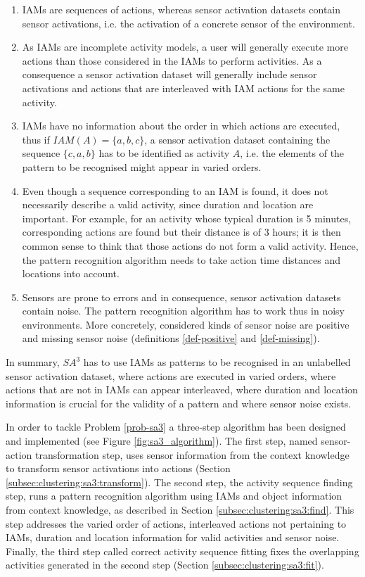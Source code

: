 \begin{enumerate}
 \item IAMs are sequences of actions, whereas sensor activation datasets contain sensor activations, i.e. the activation of a concrete sensor of the environment.
 \item As IAMs are incomplete activity models, a user will generally execute more actions than those considered in the IAMs to perform activities. As a consequence a sensor activation dataset will generally include sensor activations and actions that are interleaved with IAM actions for the same activity.
 \item IAMs have no information about the order in which actions are executed, thus if $IAM(A) = \{a, b, c\}$, a sensor activation dataset containing the sequence $\{c, a, b\}$ has to be identified as activity $A$, i.e. the elements of the pattern to be recognised might appear in varied orders.
 \item Even though a sequence corresponding to an IAM is found, it does not necessarily describe a valid activity, since duration and location are important. For example, for an activity whose typical duration is 5 minutes, corresponding actions are found but their distance is of 3 hours; it is then common sense to think that those actions do not form a valid activity. Hence, the pattern recognition algorithm needs to take action time distances and locations into account.
 \item Sensors are prone to errors and in consequence, sensor activation datasets contain noise. The pattern recognition algorithm has to work thus in noisy environments. More concretely, considered kinds of sensor noise are positive and missing sensor noise (definitions \ref{def-positive} and \ref{def-missing}).
\end{enumerate}

In summary, $SA^3$ has to use IAMs as patterns to be recognised in an unlabelled sensor activation dataset, where actions are executed in varied orders, where actions that are not in IAMs can appear interleaved, where duration and location information is crucial for the validity of a pattern and where sensor noise exists. 

In order to tackle Problem \ref{prob-sa3} a three-step algorithm has been designed and implemented (see Figure \ref{fig:sa3_algorithm}). The first step, named sensor-action transformation step, uses sensor information from the context knowledge to transform sensor activations into actions (Section \ref{subsec:clustering:sa3:transform}). The second step, the activity sequence finding step, runs a pattern recognition algorithm using IAMs and object information from context knowledge, as described in Section \ref{subsec:clustering:sa3:find}. This step addresses the varied order of actions, interleaved actions not pertaining to IAMs, duration and location information for valid activities and sensor noise. Finally, the third step called correct activity sequence fitting fixes the overlapping activities generated in the second step (Section \ref{subsec:clustering:sa3:fit}).


